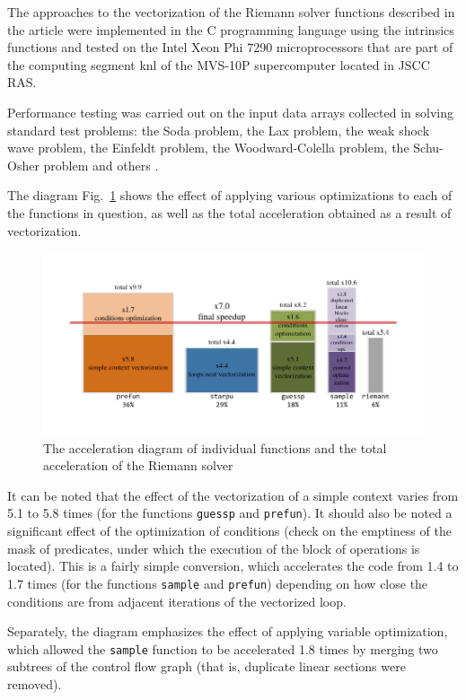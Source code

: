 \documentclass[utf8,english]{psta}%
\begin{document}
The approaches to the vectorization of the Riemann solver functions described in the article were implemented in the C programming language using the intrinsics functions and tested on the Intel Xeon Phi 7290 microprocessors that are part of the computing segment knl of the MVS-10P supercomputer located in JSCC RAS.

Performance testing was carried out on the input data arrays collected in solving standard test problems: the Soda problem, the Lax problem, the weak shock wave problem, the Einfeldt problem, the Woodward-Colella problem, the Schu-Osher problem and others \cite{BulVolTest}.

The diagram Fig.~\ref{pic:perf} shows the effect of applying various optimizations to each of the functions in question, as well as the total acceleration obtained as a result of vectorization.

\begin{figure}
\includegraphics[width=12cm]{pics/pic_perf_eng}
\caption{The acceleration diagram of individual functions and the total acceleration of the Riemann solver}
\label{pic:perf}
\end{figure}

It can be noted that the effect of the vectorization of a simple context varies from 5.1 to 5.8 times (for the functions \texttt{guessp} and \texttt{prefun}).
It should also be noted a significant effect of the optimization of conditions (check on the emptiness of the mask of predicates, under which the execution of the block of operations is located).
This is a fairly simple conversion, which accelerates the code from 1.4 to 1.7 times (for the functions \texttt{sample} and \texttt{prefun}) depending on how close the conditions are from adjacent iterations of the vectorized loop.

Separately, the diagram emphasizes the effect of applying variable optimization, which allowed the \texttt{sample} function to be accelerated 1.8 times by merging two subtrees of the control flow graph (that is, duplicate linear sections were removed).
\end{document}
